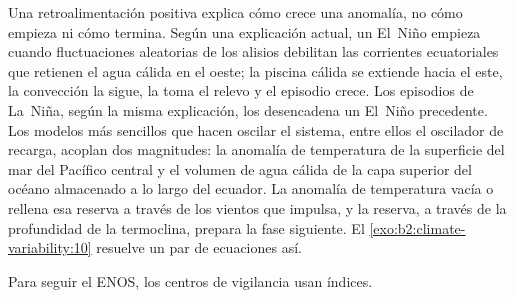 \begin{omfigure}
\centering
{}
\par{}
\end{omfigure}

Una retroalimentación positiva explica cómo crece una anomalía, no cómo empieza ni cómo termina. Según una explicación actual,
un El~Niño empieza cuando fluctuaciones aleatorias de los alisios debilitan las corrientes ecuatoriales que
retienen el agua cálida en el oeste; la piscina cálida se extiende hacia el este, la convección la sigue, la
 toma el relevo y el episodio crece. Los episodios de La~Niña, según la misma explicación,
los desencadena un El~Niño precedente. Los modelos más sencillos que hacen oscilar el sistema, entre ellos el oscilador
de recarga, acoplan dos magnitudes: la anomalía de temperatura de la superficie del mar del Pacífico
central y el volumen de agua cálida de la capa superior del océano almacenado a lo largo del ecuador. La anomalía de
temperatura vacía o rellena esa reserva a través de los vientos que impulsa, y la reserva, a través de la
profundidad de la termoclina, prepara la fase siguiente. El \cref{exo:b2:climate-variability:10} resuelve
un par de ecuaciones así.

Para seguir el ENOS, los centros de vigilancia usan índices.

